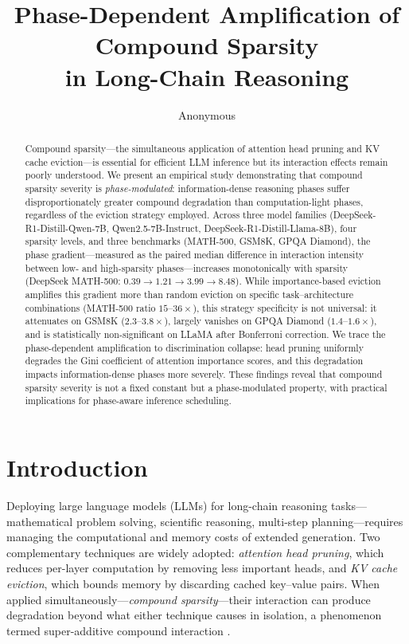 \documentclass[11pt,a4paper]{article}
\title{Phase-Dependent Amplification of Compound Sparsity\\in Long-Chain Reasoning}
\author{Anonymous}
\begin{document}
\maketitle

\begin{abstract}
Compound sparsity---the simultaneous application of attention head pruning and KV cache eviction---is essential for efficient LLM inference but its interaction effects remain poorly understood. We present an empirical study demonstrating that compound sparsity severity is \emph{phase-modulated}: information-dense reasoning phases suffer disproportionately greater compound degradation than computation-light phases, regardless of the eviction strategy employed. Across three model families (DeepSeek-R1-Distill-Qwen-7B, Qwen2.5-7B-Instruct, DeepSeek-R1-Distill-Llama-8B), four sparsity levels, and three benchmarks (MATH-500, GSM8K, GPQA Diamond), the phase gradient---measured as the paired median difference in interaction intensity between low- and high-sparsity phases---increases monotonically with sparsity (DeepSeek MATH-500: $0.39 \to 1.21 \to 3.99 \to 8.48$). While importance-based eviction amplifies this gradient more than random eviction on specific task--architecture combinations (MATH-500 ratio $15$--$36\times$), this strategy specificity is not universal: it attenuates on GSM8K ($2.3$--$3.8\times$), largely vanishes on GPQA Diamond ($1.4$--$1.6\times$), and is statistically non-significant on LLaMA after Bonferroni correction. We trace the phase-dependent amplification to discrimination collapse: head pruning uniformly degrades the Gini coefficient of attention importance scores, and this degradation impacts information-dense phases more severely. These findings reveal that compound sparsity severity is not a fixed constant but a phase-modulated property, with practical implications for phase-aware inference scheduling.
\end{abstract}

\section{Introduction}

Deploying large language models (LLMs) for long-chain reasoning tasks---mathematical problem solving, scientific reasoning, multi-step planning---requires managing the computational and memory costs of extended generation. Two complementary techniques are widely adopted: \emph{attention head pruning}, which reduces per-layer computation by removing less important heads, and \emph{KV cache eviction}, which bounds memory by discarding cached key--value pairs. When applied simultaneously---\emph{compound sparsity}---their interaction can produce degradation beyond what either technique causes in isolation, a phenomenon termed super-additive compound interaction \cite{liu2024sparsecompress,he2024sparseattn}.
\end{document}
